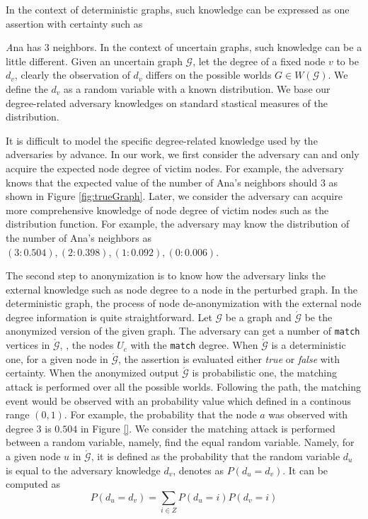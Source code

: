 In the context of deterministic graphs, such knowledge can be expressed as one assertion with certainty such as {\emph Ana has 3 neighbors. In the context of uncertain graphs, such knowledge can be a little different. Given an uncertain graph $\mathcal{G}$, let the degree of a fixed node $v$ to be $d_{v}$, clearly the observation of $d_{v}$ differs on the possible worlds $G \in W(\mathcal{G})$. We define the $d_{v}$ as a random variable with a known distribution. We base our degree-related adversary knowledges on standard stastical measures of the distribution. 

It is difficult to model the specific degree-related knowledge used by the adversaries by advance. In our work, we first consider the adversary can and only acquire the expected node degree of victim nodes. For example, the adversary knows that the expected value of the number of Ana's neighbors should $3$  as shown in Figure \ref{fig:trueGraph}.  Later, we consider the adversary can acquire more comprehensive knowledge of node degree of victim nodes such as the distribution function. For example, the adversary may know the distribution of the number of Ana's neighbors as ${(3:0.504),(2:0.398),(1:0.092),(0:0.006)}$. 

The second step to anonymization is to know how the adversary links the external knowledge such as node degree to a node in the perturbed graph. In the deterministic graph, the process of node de-anonymization with the external node degree information is quite straightforward. Let $\mathcal{G}$ be a graph and $\acute{\mathcal{G}}$ be the anonymized version of the given graph. The adversary can get a number of \texttt{match} vertices in $\acute{\mathcal{G}}$, {\ie}, the nodes $U_{c}$ with the \texttt{match} degree. When $\acute{\mathcal{G}}$ is a deterministic one, for a given node in $\acute{\mathcal{G}}$, the assertion is evaluated either \emph{true} or \emph{false} with certainty. When the anonymized output $\acute{\mathcal{G}}$ is probabilistic one, the matching attack is performed over all the possible worlds. Following the path, the matching event would be observed with an probability value which defined in a continous range $(0,1)$. For example, the probability that the node $a$ was observed with degree $3$ is $0.504$ in Figure \ref{}. We consider the matching attack is performed between a random variable, namely, find the equal random variable. Namely, for a given node $u$ in $\acute{\mathcal{G}}$, it is defined as the probability that the random variable $d_{u}$ is equal to the adversary knowledge $d_{v}$, denotes as $P(d_{u}=d_{v})$. It can be computed as 
\begin{equation*}
    P(d_{u}=d_{v})= \sum_{i \in Z } P(d_{u}=i) P(d_{v}=i) 
\end{equation*}

}
